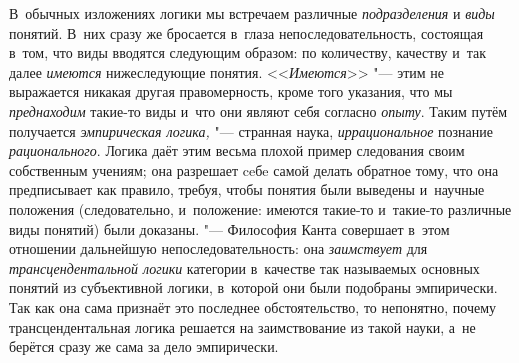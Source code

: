 В~обычных изложениях логики мы встречаем различные
{\em подразделения} и {\em виды} понятий. В~них
сразу же бросается в~глаза непоследовательность, состоящая в~том, что виды
вводятся следующим образом: по количеству, качеству и~так далее
{\em имеются} нижеследующие понятия. <<{\em Имеются}>> "--- этим не
выражается никакая другая правомерность, кроме того указания, что мы
{\em преднаходим} такие-то виды и~что они являют себя согласно
{\em опыту}. Таким путём получается {\em эмпирическая логика,} "---
странная наука, {\em иррациональное} познание {\em рационального}.
Логика даёт этим весьма плохой пример следования своим
собственным учениям; она разрешает ceбe самой делать обратное тому, что она
предписывает как правило, требуя, чтобы понятия были выведены и~научные
положения (следовательно, и~положение: имеются такие-то и~такие-то
различные виды понятий) были доказаны. "--- Философия Канта
совершает в~этом отношении дальнейшую непоследовательность: она
{\em заимствует} для {\em трансцендентальной логики}
категории в~качестве так называемых основных
понятий из субъективной логики, в~которой они были подобраны эмпирически.
Так как она сама признаёт это последнее обстоятельство, то непонятно,
почему трансцендентальная логика решается на заимствование из такой науки,
а~не берётся сразу же сама за дело эмпирически.

